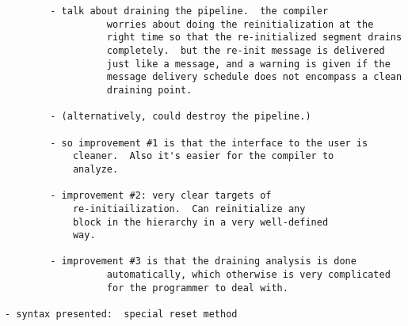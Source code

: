 \begin{verbatim}
		- talk about draining the pipeline.  the compiler
                  worries about doing the reinitialization at the
                  right time so that the re-initialized segment drains
                  completely.  but the re-init message is delivered
                  just like a message, and a warning is given if the
                  message delivery schedule does not encompass a clean
                  draining point.

		- (alternatively, could destroy the pipeline.)

		- so improvement #1 is that the interface to the user is 
			cleaner.  Also it's easier for the compiler to 
			analyze.

		- improvement #2: very clear targets of
			re-initiailization.  Can reinitialize any
			block in the hierarchy in a very well-defined
			way.

		- improvement #3 is that the draining analysis is done
                  automatically, which otherwise is very complicated
                  for the programmer to deal with.

- syntax presented:  special reset method

\end{verbatim}






